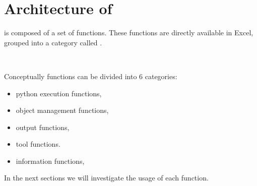 \chapter{Architecture of \xlp}

\xlp is composed of a set of functions. These functions are directly available in Excel, grouped into a category called \xlp.


\

Conceptually functions can be divided into 6 categories:

\begin{itemize}
\item python execution functions,
\item object management functions,
\item output functions,
\item tool functions.
\item information functions,
\end{itemize} 

In the next sections we will investigate the usage of each function.

